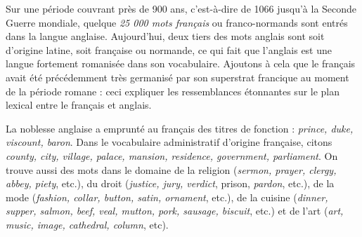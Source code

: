 Sur une période couvrant près de 900 ans, c’est-à-dire de 1066 jusqu’à la Seconde Guerre mondiale, quelque \textit{25 000 mots français} ou franco-normands sont entrés dans la langue anglaise. Aujourd’hui, deux tiers des mots anglais sont soit d’origine latine, soit française ou normande, ce qui fait que l’anglais est une langue fortement romanisée dans son vocabulaire. Ajoutons à cela que le français avait été précédemment très germanisé par son superstrat francique au moment de la période romane : ceci expliquer les ressemblances étonnantes sur le plan lexical entre le français et anglais.

La noblesse anglaise a emprunté au français des titres de fonction : \textit{prince, duke, viscount, baron}. Dans le vocabulaire administratif d’origine française, citons \textit{county, city, village, palace, mansion, residence, government, parliament}. On trouve aussi des mots dans le domaine de la religion (\textit{sermon, prayer, clergy, abbey, piety}, etc.), du droit (\textit{justice, jury, verdict}, prison, \textit{pardon}, etc.), de la mode (\textit{fashion, collar, button, satin, ornament}, etc.), de la cuisine (\textit{dinner, supper, salmon, beef, veal, mutton, pork, sausage, biscuit}, etc.) et de l’art (\textit{art, music, image, cathedral, column}, etc).

